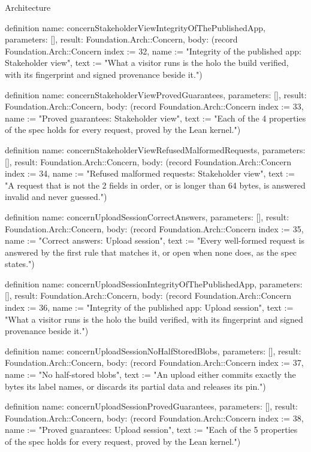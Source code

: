 \begin{lexlean}{Architecture}
\begin{semanticmodule}
definition{
  name: concernStakeholderViewIntegrityOfThePublishedApp,
  parameters: [],
  result: Foundation.Arch::Concern,
  body: (record Foundation.Arch::Concern {index := 32, name := "Integrity of the published app: Stakeholder view", text := "What a visitor runs is the holo the build verified, with its fingerprint and signed provenance beside it."})
}

definition{
  name: concernStakeholderViewProvedGuarantees,
  parameters: [],
  result: Foundation.Arch::Concern,
  body: (record Foundation.Arch::Concern {index := 33, name := "Proved guarantees: Stakeholder view", text := "Each of the 4 properties of the spec holds for every request, proved by the Lean kernel."})
}

definition{
  name: concernStakeholderViewRefusedMalformedRequests,
  parameters: [],
  result: Foundation.Arch::Concern,
  body: (record Foundation.Arch::Concern {index := 34, name := "Refused malformed requests: Stakeholder view", text := "A request that is not the 2 fields in order, or is longer than 64 bytes, is answered invalid and never guessed."})
}

definition{
  name: concernUploadSessionCorrectAnswers,
  parameters: [],
  result: Foundation.Arch::Concern,
  body: (record Foundation.Arch::Concern {index := 35, name := "Correct answers: Upload session", text := "Every well-formed request is answered by the first rule that matches it, or open when none does, as the spec states."})
}

definition{
  name: concernUploadSessionIntegrityOfThePublishedApp,
  parameters: [],
  result: Foundation.Arch::Concern,
  body: (record Foundation.Arch::Concern {index := 36, name := "Integrity of the published app: Upload session", text := "What a visitor runs is the holo the build verified, with its fingerprint and signed provenance beside it."})
}

definition{
  name: concernUploadSessionNoHalfStoredBlobs,
  parameters: [],
  result: Foundation.Arch::Concern,
  body: (record Foundation.Arch::Concern {index := 37, name := "No half-stored blobs", text := "An upload either commits exactly the bytes its label names, or discards its partial data and releases its pin."})
}

definition{
  name: concernUploadSessionProvedGuarantees,
  parameters: [],
  result: Foundation.Arch::Concern,
  body: (record Foundation.Arch::Concern {index := 38, name := "Proved guarantees: Upload session", text := "Each of the 5 properties of the spec holds for every request, proved by the Lean kernel."})
}


\end{semanticmodule}
\end{lexlean}
